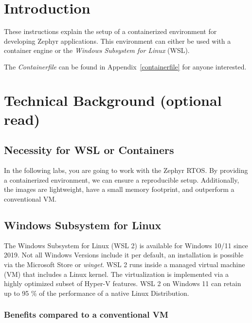 



\puttitle{}

\section{Introduction}

These instructions explain the setup of a containerized environment for developing Zephyr applications.
This environment can either be used with a container engine or the \emph{Windows Subsystem for Linux} (WSL).

The \emph{Containerfile} can be found in Appendix~\ref{containerfile} for anyone interested.



\section{Technical Background (optional read)}

\subsection{Necessity for WSL or Containers}

In the following labs, you are going to work with the Zephyr RTOS.
By providing a containerized environment, we can ensure a reproducible setup.
Additionally, the images are lightweight, have a small memory footprint, and outperform a conventional VM.

\subsection{Windows Subsystem for Linux}

The Windows Subsystem for Linux (WSL 2) is available for Windows 10/11 since 2019.
Not all Windows Versions include it per default, an installation is possible via the Microsoft Store or \emph{winget}.
WSL 2 runs inside a managed virtual machine (VM) that includes a Linux kernel.
The virtualization is implemented via a highly optimized subset of Hyper-V features.
WSL 2 on Windows 11 can retain up to 95 \% of the performance of a native Linux Distribution.

\subsubsection*{Benefits compared to a conventional VM}


